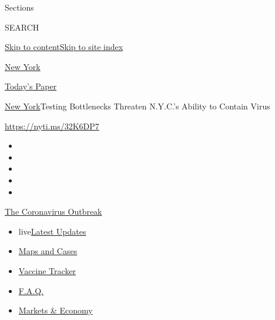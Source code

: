 Sections

SEARCH

\protect\hyperlink{site-content}{Skip to
content}\protect\hyperlink{site-index}{Skip to site index}

\href{https://www.nytimes.com/section/nyregion}{New York}

\href{https://myaccount.nytimes.com/auth/login?response_type=cookie\&client_id=vi}{}

\href{https://www.nytimes.com/section/todayspaper}{Today's Paper}

\href{/section/nyregion}{New York}\textbar{}Testing Bottlenecks Threaten
N.Y.C.'s Ability to Contain Virus

\href{https://nyti.ms/32K6DP7}{https://nyti.ms/32K6DP7}

\begin{itemize}
\item
\item
\item
\item
\item
\end{itemize}

\href{https://www.nytimes.com/news-event/coronavirus?action=click\&pgtype=Article\&state=default\&region=TOP_BANNER\&context=storylines_menu}{The
Coronavirus Outbreak}

\begin{itemize}
\tightlist
\item
  live\href{https://www.nytimes.com/2020/08/08/world/coronavirus-updates.html?action=click\&pgtype=Article\&state=default\&region=TOP_BANNER\&context=storylines_menu}{Latest
  Updates}
\item
  \href{https://www.nytimes.com/interactive/2020/us/coronavirus-us-cases.html?action=click\&pgtype=Article\&state=default\&region=TOP_BANNER\&context=storylines_menu}{Maps
  and Cases}
\item
  \href{https://www.nytimes.com/interactive/2020/science/coronavirus-vaccine-tracker.html?action=click\&pgtype=Article\&state=default\&region=TOP_BANNER\&context=storylines_menu}{Vaccine
  Tracker}
\item
  \href{https://www.nytimes.com/interactive/2020/world/coronavirus-tips-advice.html?action=click\&pgtype=Article\&state=default\&region=TOP_BANNER\&context=storylines_menu}{F.A.Q.}
\item
  \href{https://www.nytimes.com/live/2020/08/07/business/stock-market-today-coronavirus?action=click\&pgtype=Article\&state=default\&region=TOP_BANNER\&context=storylines_menu}{Markets
  \& Economy}
\end{itemize}

